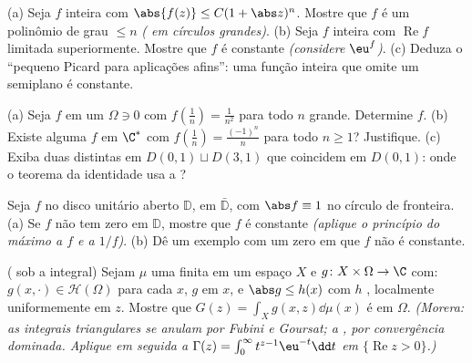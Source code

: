\begin{exercise}[$\star\star$]\label{exo:b3:holomorphic:4}
(a) Seja $f$ inteira com $\abs{f(z)} \leq C(1 + \abs
z)^{n}$. Mostre que $f$ é um polinômio de
grau $\leq n$ \emph{( em círculos grandes)}.
(b) Seja $f$ inteira com $\operatorname{Re}f$ limitada superiormente. Mostre que
$f$ é constante \emph{(considere $\eu^{f}$)}.
(c) Deduza o ``pequeno Picard para aplicações afins'': uma função
inteira que omite um semiplano é constante.
\end{exercise}

\begin{exercise}[$\star\star$]\label{exo:b3:holomorphic:5}
(a) Seja $f$  em um  $\Omega \ni 0$ com $f(\frac1n) = \frac1{n^2}$ para todo $n$
grande. Determine $f$.
(b) Existe alguma $f$  em $\C^*$ com $f(\frac1n) =
\frac{(-1)^n}{n}$ para todo
$n \geq 1$? Justifique.
(c) Exiba duas  distintas em $D(0,1)\sqcup D(3,1)$ que coincidem em
$D(0,1)$: onde o teorema da identidade usa a ?
\end{exercise}

\begin{exercise}[$\star\star$]\label{exo:b3:holomorphic:6}
Seja $f$  no disco unitário aberto $\mathbb D$,  em
$\bar{\mathbb D}$, com $\abs f \equiv 1$ no círculo de fronteira.
(a) Se $f$ não tem zero em $\mathbb D$, mostre que $f$ é constante
\emph{(aplique o princípio do máximo a $f$ e a $1/f$)}.
(b) Dê um exemplo com um zero em que $f$ não é constante.
\end{exercise}

\begin{exercise}[$\star\star$]\label{exo:b3:holomorphic:7}
( sob a integral) Sejam $\mu$ uma  finita em um
espaço $X$ e $g \colon X\times\Omega \to \C$ com: $g(x, \cdot) \in \mathcal H(\Omega)$ para cada $x$, $g$ 
em $x$, e $\abs g \leq h(x)$ com $h$ , localmente uniformemente em
$z$. Mostre que $G(z) = \int_Xg(x, z)\dd\mu(x)$ é  em $\Omega$. \emph{(Morera: as
integrais triangulares se anulam por Fubini e Goursat; a ,
por convergência dominada. Aplique em seguida a $\Gamma(z) =
\int_0^\infty t^{z-1}\eu^{-t}\dd t$ em $\{\operatorname{Re}z >
0\}$.)}
\end{exercise}

